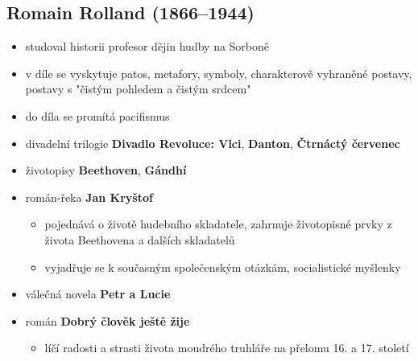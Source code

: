 \subsection{Romain Rolland (1866--1944)}
\begin{itemize}
\item studoval historii \ra profesor dějin hudby na Sorboně
\item v díle se vyskytuje patos, metafory, symboly, charakterově vyhraněné postavy, postavy s "čistým pohledem a čistým srdcem"
\item do díla se promítá pacifismus
\item divadelní trilogie \textbf{Divadlo Revoluce: Vlci}, \textbf{Danton}, \textbf{Čtrnáctý červenec}
\item životopisy \textbf{Beethoven}, \textbf{Gándhí}
\item román-řeka \textbf{Jan Kryštof}
	 \begin{itemize}
	 \item pojednává o životě hudebního skladatele, zahrnuje životopisné prvky z života Beethovena a dalších skladatelů
	 \item vyjadřuje se k současným společenským otázkám, socialistické myšlenky
	 \end{itemize}
\item válečná novela \textbf{Petr a Lucie}
\item román \textbf{Dobrý člověk ještě žije}
	\begin{itemize}
	\item líčí radosti a strasti života moudrého truhláře na přelomu 16. a 17. století
	\end{itemize}
\end{itemize}

